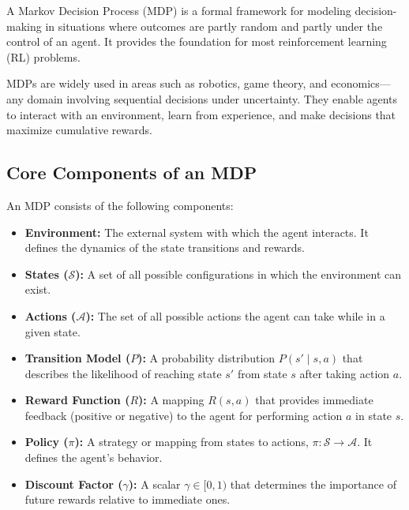 \documentclass[10pt,twocolumn,letterpaper]{article}
\begin{document}
A Markov Decision Process (MDP) is a formal framework for modeling decision-making in situations where outcomes are partly random and partly under the control of an agent. It provides the foundation for most reinforcement learning (RL) problems.

MDPs are widely used in areas such as robotics, game theory, and economics—any domain involving sequential decisions under uncertainty. They enable agents to interact with an environment, learn from experience, and make decisions that maximize cumulative rewards.

\subsection*{Core Components of an MDP}

An MDP consists of the following components:

\begin{itemize}
    \item \textbf{Environment:} The external system with which the agent interacts. It defines the dynamics of the state transitions and rewards.
    
    \item \textbf{States ($\mathcal{S}$):} A set of all possible configurations in which the environment can exist.

    \item \textbf{Actions ($\mathcal{A}$):} The set of all possible actions the agent can take while in a given state.

    \item \textbf{Transition Model ($P$):} A probability distribution $P(s' \mid s, a)$ that describes the likelihood of reaching state $s'$ from state $s$ after taking action $a$.

    \item \textbf{Reward Function ($R$):} A mapping $R(s, a)$ that provides immediate feedback (positive or negative) to the agent for performing action $a$ in state $s$.

    \item \textbf{Policy ($\pi$):} A strategy or mapping from states to actions, $\pi: \mathcal{S} \rightarrow \mathcal{A}$. It defines the agent's behavior.

    \item \textbf{Discount Factor ($\gamma$):} A scalar $\gamma \in [0, 1)$ that determines the importance of future rewards relative to immediate ones.
\end{itemize}
\end{document}
